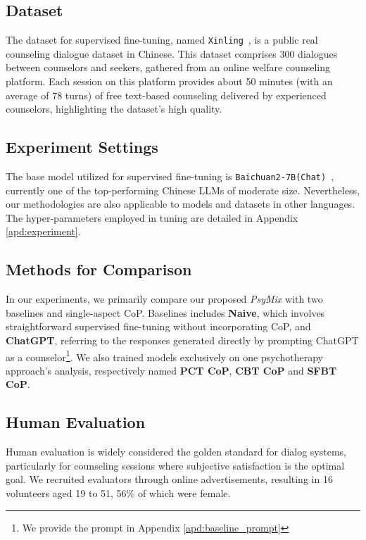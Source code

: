 \subsection{Dataset}
The dataset for supervised fine-tuning, named \texttt{Xinling}~\cite{li-etal-2023-understanding}, is a public real counseling dialogue dataset in Chinese. This dataset comprises 300 dialogues between counselors and seekers, gathered from an online welfare counseling platform.  Each session on this platform provides about 50 minutes (with an average of 78 turns) of free text-based counseling delivered by experienced counselors, highlighting the dataset's high quality.
\subsection{Experiment Settings}
The base model utilized for supervised fine-tuning is \texttt{Baichuan2-7B(Chat)}~\cite{yang2023baichuan}, currently one of the top-performing Chinese LLMs of moderate size. Nevertheless, our methodologies are also applicable to models and datasets in other languages. The hyper-parameters employed in tuning are detailed in Appendix  \ref{apd:experiment}.

\subsection{Methods for Comparison}
\label{sec:compare}
In our experiments, we primarily compare our proposed \textit{PsyMix} with two baselines and single-aspect CoP. 
Baselines includes \textbf{Naive}, which involves straightforward supervised fine-tuning without incorporating CoP, and  \textbf{ChatGPT}, referring to the responses generated directly by prompting ChatGPT as a counselor\footnote{We provide the prompt in Appendix \ref{apd:baseline_prompt}}. %
We also trained models exclusively on one psychotherapy approach's analysis, respectively named \textbf{PCT CoP}, \textbf{CBT CoP} and \textbf{SFBT CoP}.

\subsection{Human Evaluation}
Human evaluation is widely considered the golden standard for dialog systems, particularly for counseling sessions where subjective satisfaction is the optimal goal. We recruited evaluators through online advertisements, resulting in 16 volunteers aged 19 to 51, 56\% of which were female.%
